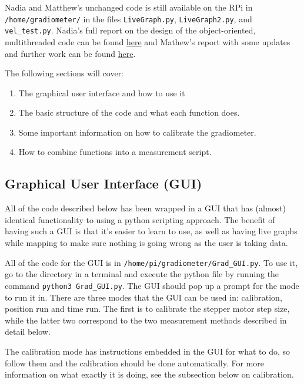 \documentclass{TheMartianReport}
\newcommand{\shellinline}[1]{\texttt{#1}}
\begin{document}
Nadia and Matthew's unchanged code is still available on the RPi in \shellinline{/home/gradiometer/} in the files \shellinline{LiveGraph.py}, \shellinline{LiveGraph2.py}, and \shellinline{vel_test.py}. Nadia's full report on the design of the object-oriented, multithreaded code can be found \href{https://ucn.triumf.ca/edm/magnetic-shielding/gradiometer-setup-at-triumf/TRIUMF%20Final%20Report%20Chigmaroff.pdf/view}{here} and Mathew's report with some updates and further work can be found \href{https://ucn.triumf.ca/edm/magnetic-shielding/gradiometer-setup-at-triumf/Gradiometer_Report.pdf/view}{here}.

The following sections will cover:
\begin{enumerate}
	\item The graphical user interface and how to use it
	\item The basic structure of the code and what each function does.
	\item Some important information on how to calibrate the gradiometer.
	\item How to combine functions into a measurement script.
\end{enumerate}
\subsection{Graphical User Interface (GUI)} \label{subsec:GUI}
All of the code described below has been wrapped in a GUI that has (almost) identical functionality to using a python scripting approach. The benefit of having such a GUI is that it's easier to learn to use, as well as having live graphs while mapping to make sure nothing is going wrong as the user is taking data. 

All of the code for the GUI is in \shellinline{/home/pi/gradiometer/Grad_GUI.py}. To use it, go to the directory in a terminal and execute the python file by running the command \shellinline{python3 Grad_GUI.py}. The GUI should pop up a prompt for the mode to run it in. There are three modes that the GUI can be used in: calibration, position run and time run. The first is to calibrate the stepper motor step size, while the latter two correspond to the two measurement methods described in detail below. 

The calibration mode has instructions embedded in the GUI for what to do, so follow them and the calibration should be done automatically. For more information on what exactly it is doing, see the subsection below on calibration. 
\end{document}

